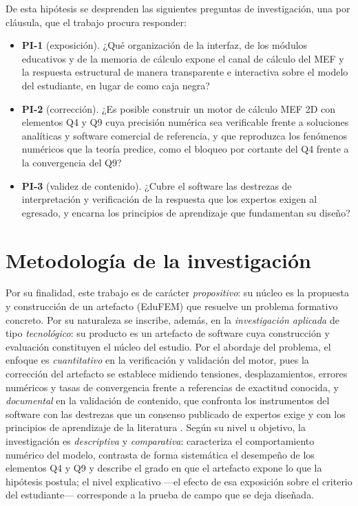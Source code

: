 De esta hipótesis se desprenden las siguientes preguntas de investigación, una por cláusula, que el trabajo procura responder:

\begin{itemize}
    \item \textbf{PI-1} (exposición). ¿Qué organización de la interfaz, de los módulos educativos y de la memoria de cálculo expone el canal de cálculo del MEF y la respuesta estructural de manera transparente e interactiva sobre el modelo del estudiante, en lugar de como caja negra?
    \item \textbf{PI-2} (corrección). ¿Es posible construir un motor de cálculo MEF 2D con elementos Q4 y Q9 cuya precisión numérica sea verificable frente a soluciones analíticas y software comercial de referencia, y que reproduzca los fenómenos numéricos que la teoría predice, como el bloqueo por cortante del Q4 frente a la convergencia del Q9?
    \item \textbf{PI-3} (validez de contenido). ¿Cubre el software las destrezas de interpretación y verificación de la respuesta que los expertos exigen al egresado, y encarna los principios de aprendizaje que fundamentan su diseño?
\end{itemize}

\section*{Metodología de la investigación}

Por su finalidad, este trabajo es de carácter \emph{propositivo}: su núcleo es la propuesta y construcción de un artefacto (EduFEM) que resuelve un problema formativo concreto. Por su naturaleza se inscribe, además, en la \emph{investigación aplicada} de tipo \emph{tecnológico}: su producto es un artefacto de software cuya construcción y evaluación constituyen el núcleo del estudio. Por el abordaje del problema, el enfoque es \emph{cuantitativo} en la verificación y validación del motor, pues la corrección del artefacto se establece midiendo tensiones, desplazamientos, errores numéricos y tasas de convergencia frente a referencias de exactitud conocida, y \emph{documental} en la validación de contenido, que confronta los instrumentos del software con las destrezas que un consenso publicado de expertos exige y con los principios de aprendizaje de la literatura \autocite[p.~168]{lee2015interactive}. Según su nivel u objetivo, la investigación es \emph{descriptiva} y \emph{comparativa}: caracteriza el comportamiento numérico del modelo, contrasta de forma sistemática el desempeño de los elementos Q4 y Q9 y describe el grado en que el artefacto expone lo que la hipótesis postula; el nivel explicativo —el efecto de esa exposición sobre el criterio del estudiante— corresponde a la prueba de campo que se deja diseñada.

